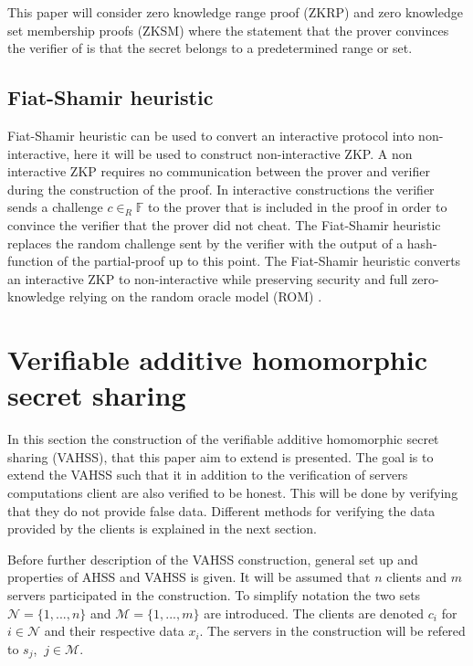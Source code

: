 This paper will consider zero knowledge range proof (ZKRP) and zero knowledge set membership proofs (ZKSM) where the statement that the prover convinces the verifier of is that the secret belongs to a predetermined range or set.


\subsection*{Fiat-Shamir heuristic}
 Fiat-Shamir heuristic \cite{Fiat-Shamir} can be used to convert an interactive protocol into non-interactive, here it will be used to construct non-interactive ZKP. A non interactive  ZKP requires no communication between the prover and verifier during the construction of the proof. In interactive constructions the verifier sends a challenge $c\in_R\mathds{F}$ to the prover that is included in the proof in order to convince the verifier that the prover did not cheat. The Fiat-Shamir heuristic replaces the random challenge sent by the verifier with the output of a hash-function of the partial-proof up to this point. The Fiat-Shamir heuristic converts an interactive ZKP to non-interactive while preserving security and full zero-knowledge relying on the random oracle model (ROM) \cite{Fiat-Shamir} .

\section{Verifiable additive homomorphic secret sharing}
\label{sec:VAHSS}

In this section the construction of the verifiable additive homomorphic secret sharing (VAHSS), that this paper aim to extend is presented. The goal is to extend the VAHSS such that it in addition to  the verification of servers computations client are also verified to be honest. This will be done  by verifying that they do not provide false data. Different methods for verifying the data provided by the clients is explained in the next section.

Before further description of the VAHSS construction, general set up and properties of AHSS and VAHSS is given. It will be assumed that $n$ clients and $m$ servers participated in the construction. To simplify notation the two sets $\mathcal{N}=\{1,...,n\}$ and $\mathcal{M} = \{1,...,m\}$ are introduced. The clients are denoted $c_i$ for $i\in\mathcal{N}$ and their respective data $x_i$.  The servers in the construction will be refered to $s_j$, $\:j\in\mathcal{M}$.

